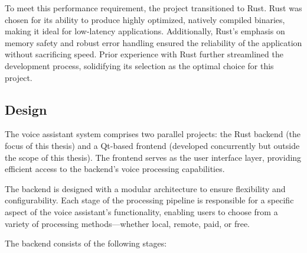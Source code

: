 To meet this performance requirement, the project transitioned to Rust.
Rust was chosen for its ability to produce highly optimized, natively compiled binaries,
making it ideal for low-latency applications.
Additionally, Rust's emphasis on memory safety and robust error handling
ensured the reliability of the application without sacrificing speed.
Prior experience with Rust further streamlined the development process,
solidifying its selection as the optimal choice for this project.

\subsection{Design}
\label{sec:design}
The voice assistant system comprises two parallel projects:
the Rust backend (the focus of this thesis) and a Qt-based frontend
(developed concurrently but outside the scope of this thesis).
The frontend serves as the user interface layer,
providing efficient access to the backend's voice processing capabilities.

The backend is designed with a modular architecture to ensure flexibility and configurability.
Each stage of the processing pipeline is responsible for a specific aspect of the voice assistant's functionality,
enabling users to choose from a variety of processing methods—whether local, remote, paid, or free.

The backend consists of the following stages:


